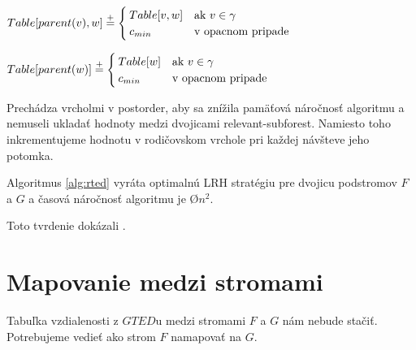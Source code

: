 \begin{algorithm}
\begin{algorithmic}[1]
  \item[]

      \State $Table[parent(v), w] \stackrel{+}{=}
        \begin{cases}
          Table[v, w] & \text{ak $v \in \gamma$}
          \\
          c_{min} & \text{v opacnom pripade}
        \end{cases}$
    \EndProcedure

      \State $Table[parent(w)] \stackrel{+}{=}
        \begin{cases}
          Table[w] & \text{ak $v \in \gamma$}
          \\
          c_{min} & \text{v opacnom pripade}
        \end{cases}$
    \EndProcedure
  \end{algorithmic}
\end{algorithm}

Prechádza vrcholmi v postorder, aby sa znížila pamäťová náročnosť algoritmu a nemuseli ukladať hodnoty
medzi dvojicami relevant-subforest. Namiesto toho inkrementujeme hodnotu v rodičovskom vrchole pri
každej návšteve jeho potomka.

\begin{lemma}
  Algoritmus \ref{alg:rted} vyráta optimalnú LRH stratégiu pre dvojicu podstromov $F$ a $G$ a
  časová náročnosť algoritmu je \O{$n^2$}.
\end{lemma}

\begin{dukaz}
  Toto tvrdenie dokázali \citet{RTED}.
\end{dukaz}


\section{Mapovanie medzi stromami}

Tabuľka vzdialenosti z $GTED$u medzi stromami $F$ a $G$ nám nebude stačiť.
Potrebujeme vedieť ako strom $F$ namapovať na $G$.

